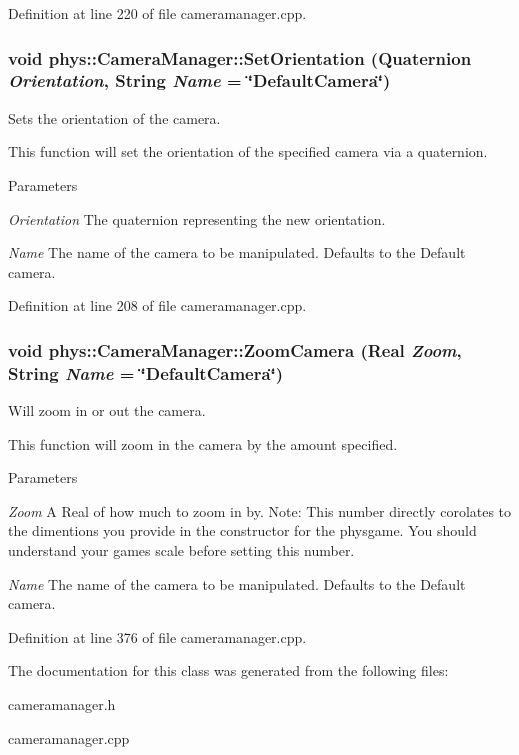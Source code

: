 Definition at line 220 of file cameramanager.cpp.

\hypertarget{classphys_1_1CameraManager_a9d0fac66fbc2eb4b7247c9661427afb8}{
\subsubsection[{SetOrientation}]{\setlength{\rightskip}{0pt plus 5cm}void phys::CameraManager::SetOrientation ({\bf Quaternion} {\em Orientation}, \/  {\bf String} {\em Name} = {\ttfamily \char`\"{}DefaultCamera\char`\"{}})}}
\label{d9/d91/classphys_1_1CameraManager_a9d0fac66fbc2eb4b7247c9661427afb8}


Sets the orientation of the camera. 

This function will set the orientation of the specified camera via a quaternion. 
\begin{DoxyParams}{Parameters}
\item[{\em Orientation}]The quaternion representing the new orientation. \item[{\em Name}]The name of the camera to be manipulated. Defaults to the Default camera. \end{DoxyParams}


Definition at line 208 of file cameramanager.cpp.

\hypertarget{classphys_1_1CameraManager_aa5a37dbdd45a53bc3dfd4cfa0a94bd42}{
\subsubsection[{ZoomCamera}]{\setlength{\rightskip}{0pt plus 5cm}void phys::CameraManager::ZoomCamera ({\bf Real} {\em Zoom}, \/  {\bf String} {\em Name} = {\ttfamily \char`\"{}DefaultCamera\char`\"{}})}}
\label{d9/d91/classphys_1_1CameraManager_aa5a37dbdd45a53bc3dfd4cfa0a94bd42}


Will zoom in or out the camera. 

This function will zoom in the camera by the amount specified. 
\begin{DoxyParams}{Parameters}
\item[{\em Zoom}]A Real of how much to zoom in by. Note: This number directly corolates to the dimentions you provide in the constructor for the physgame. You should understand your games scale before setting this number. \item[{\em Name}]The name of the camera to be manipulated. Defaults to the Default camera. \end{DoxyParams}


Definition at line 376 of file cameramanager.cpp.



The documentation for this class was generated from the following files:\begin{DoxyCompactItemize}
\item 
cameramanager.h\item 
cameramanager.cpp\end{DoxyCompactItemize}
